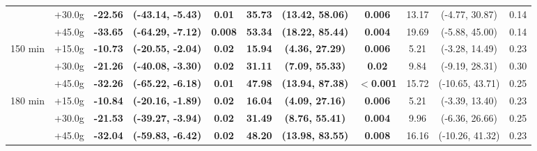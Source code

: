 \begin{table}[ht]
{\begin{tabular}{llccccccccc}
 & +30.0g & \textbf{-22.56} & \textbf{(-43.14, -5.43)} & \textbf{0.01} & \textbf{35.73} & \textbf{(13.42, 58.06)} & \textbf{0.006} & 13.17 & (-4.77, 30.87) & 0.14 \\
 & +45.0g & \textbf{-33.65} & \textbf{(-64.29, -7.12)} & \textbf{0.008} & \textbf{53.34} & \textbf{(18.22, 85.44)} & \textbf{0.004} & 19.69 & (-5.88, 45.00) & 0.14 \\
\midrule
\multirow{3}{*}{150 min} & +15.0g & \textbf{-10.73} & \textbf{(-20.55, -2.04)} & \textbf{0.02} & \textbf{15.94} & \textbf{(4.36, 27.29)} & \textbf{0.006} & 5.21 & (-3.28, 14.49) & 0.23 \\
 & +30.0g & \textbf{-21.26} & \textbf{(-40.08, -3.30)} & \textbf{0.02} & \textbf{31.11} & \textbf{(7.09, 55.33)} & \textbf{0.02} & 9.84 & (-9.19, 28.31) & 0.30 \\
 & +45.0g & \textbf{-32.26} & \textbf{(-65.22, -6.18)} & \textbf{0.01} & \textbf{47.98} & \textbf{(13.94, 87.38)} & \textbf{$<$0.001} & 15.72 & (-10.65, 43.71) & 0.25 \\
\midrule
\multirow{3}{*}{180 min} & +15.0g & \textbf{-10.84} & \textbf{(-20.16, -1.89)} & \textbf{0.02} & \textbf{16.04} & \textbf{(4.09, 27.16)} & \textbf{0.006} & 5.21 & (-3.39, 13.40) & 0.23 \\
 & +30.0g & \textbf{-21.53} & \textbf{(-39.27, -3.94)} & \textbf{0.02} & \textbf{31.49} & \textbf{(8.76, 55.41)} & \textbf{0.004} & 9.96 & (-6.36, 26.66) & 0.25 \\
 & +45.0g & \textbf{-32.04} & \textbf{(-59.83, -6.42)} & \textbf{0.02} & \textbf{48.20} & \textbf{(13.98, 83.55)} & \textbf{0.008} & 16.16 & (-10.26, 41.32) & 0.23 \\
\bottomrule
\end{tabular}%
}
\end{table}
